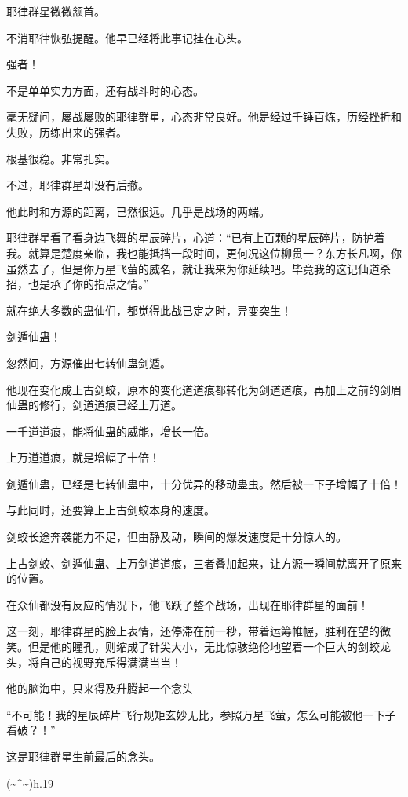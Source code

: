 \begin{this_body}
耶律群星微微颔首。

不消耶律恢弘提醒。他早已经将此事记挂在心头。

强者！

不是单单实力方面，还有战斗时的心态。

毫无疑问，屡战屡败的耶律群星，心态非常良好。他是经过千锤百炼，历经挫折和失败，历练出来的强者。

根基很稳。非常扎实。

不过，耶律群星却没有后撤。

他此时和方源的距离，已然很远。几乎是战场的两端。

耶律群星看了看身边飞舞的星辰碎片，心道：“已有上百颗的星辰碎片，防护着我。就算是楚度亲临，我也能抵挡一段时间，更何况这位柳贯一？东方长凡啊，你虽然去了，但是你万星飞萤的威名，就让我来为你延续吧。毕竟我的这记仙道杀招，也是承了你的指点之情。”

就在绝大多数的蛊仙们，都觉得此战已定之时，异变突生！

剑遁仙蛊！

忽然间，方源催出七转仙蛊剑遁。

他现在变化成上古剑蛟，原本的变化道道痕都转化为剑道道痕，再加上之前的剑眉仙蛊的修行，剑道道痕已经上万道。

一千道道痕，能将仙蛊的威能，增长一倍。

上万道道痕，就是增幅了十倍！

剑遁仙蛊，已经是七转仙蛊中，十分优异的移动蛊虫。然后被一下子增幅了十倍！

与此同时，还要算上上古剑蛟本身的速度。

剑蛟长途奔袭能力不足，但由静及动，瞬间的爆发速度是十分惊人的。

上古剑蛟、剑遁仙蛊、上万剑道道痕，三者叠加起来，让方源一瞬间就离开了原来的位置。

在众仙都没有反应的情况下，他飞跃了整个战场，出现在耶律群星的面前！

这一刻，耶律群星的脸上表情，还停滞在前一秒，带着运筹帷幄，胜利在望的微笑。但是他的瞳孔，则缩成了针尖大小，无比惊骇绝伦地望着一个巨大的剑蛟龙头，将自己的视野充斥得满满当当！

他的脑海中，只来得及升腾起一个念头

“不可能！我的星辰碎片飞行规矩玄妙无比，参照万星飞萤，怎么可能被他一下子看破？！”

这是耶律群星生前最后的念头。

(\~{}\^{}\~{})h.19

\end{this_body}


